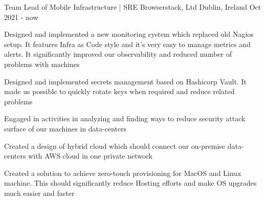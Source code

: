 


\begin{cventries}

  \cventry
    {Team Lead of Mobile Infrastructure | SRE} %
    {Browserstack, Ltd} %
    {Dublin, Ireland} %
    {Oct 2021 - now} %
    {
      \begin{cvitems} %
        \item {Designed and implemented a new monitoring system which replaced old Nagios setup. It features Infra as Code style and it's very easy to manage metrics and alerts. It significantly improved our observability and reduced number of problems with machines}
        \item {Designed and implemented secrets management based on Hashicorp Vault. It made us possible to quickly rotate keys when required and reduce related problems}
        \item {Engaged in activities in analyzing and finding ways to reduce security attack surface of our machines in data-centers}
        \item {Created a design of hybrid cloud which should connect our on-premise data-centers with AWS cloud in one private network}
        \item {Created a solution to achieve zero-touch provisioning for MacOS and Linux machine. This should significantly reduce Hosting efforts and make OS upgrades much easier and faster}
      \end{cvitems}
    }


\end{cventries}
